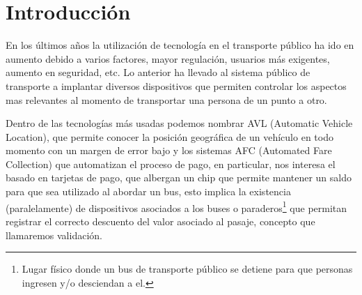 \documentclass[12pt]{article}
\begin{document}


        \tableofcontents   %



        \newpage



        \newpage
        \section{Introducción}


        En los últimos años la utilización de tecnología en el transporte público ha ido en aumento debido a varios factores, mayor regulación, usuarios más exigentes, aumento en seguridad, etc. Lo anterior ha llevado al sistema público de transporte a implantar diversos dispositivos que permiten controlar los aspectos mas relevantes al momento de transportar una persona de un punto a otro.

        Dentro de las tecnologías más usadas podemos nombrar AVL (Automatic Vehicle Location), que permite conocer la posición geográfica de un vehículo en todo momento con un margen de error bajo y los sistemas AFC (Automated Fare Collection) que automatizan el proceso de pago, en particular, nos interesa el basado en tarjetas de pago, que albergan un chip que permite mantener un saldo para que sea utilizado al abordar un bus, esto implica la existencia (paralelamente) de dispositivos asociados a los buses o paraderos\footnote{Lugar físico donde un bus de transporte público se detiene para que personas ingresen y/o desciendan a el.} que permitan registrar el correcto descuento del valor asociado al pasaje, concepto que llamaremos validación.
\end{document}
